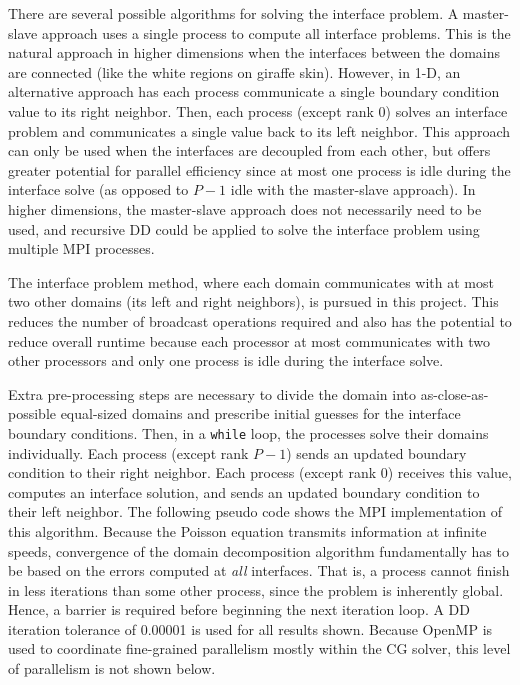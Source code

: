\documentclass[10pt]{article}
\begin{document}
\begin{enumerate}
There are several possible algorithms for solving the interface problem. A master-slave approach uses a single process to compute all interface problems. This is the natural approach in higher dimensions when the interfaces between the domains are connected (like the white regions on giraffe skin). However, in 1-D, an alternative approach has each process communicate a single boundary condition value to its right neighbor. Then, each process (except rank 0) solves an interface problem and communicates a single value back to its left neighbor. This approach can only be used when the interfaces are decoupled from each other, but offers greater potential for parallel efficiency since at most one process is idle during the interface solve (as opposed to \(P-1\) idle with the master-slave approach). In higher dimensions, the master-slave approach does not necessarily need to be used, and recursive DD could be applied to solve the interface problem using multiple MPI processes.
\end{enumerate}

The interface problem method, where each domain communicates with at most two other domains (its left and right neighbors), is pursued in this project. This reduces the number of broadcast operations required and also has the potential to reduce overall runtime because each processor at most communicates with two other processors and only one process is idle during the interface solve. 

Extra pre-processing steps are necessary to divide the domain into as-close-as-possible equal-sized domains and prescribe initial guesses for the interface boundary conditions. Then, in a {\tt while} loop, the processes solve their domains individually. Each process (except rank \(P-1\)) sends an updated boundary condition to their right neighbor. Each process (except rank 0) receives this value, computes an interface solution, and sends an updated boundary condition to their left neighbor. The following pseudo code shows the MPI implementation of this algorithm. Because the Poisson equation transmits information at infinite speeds, convergence of the domain decomposition algorithm fundamentally has to be based on the errors computed at {\it all} interfaces. That is, a process cannot finish in less iterations than some other process, since the problem is inherently global. Hence, a barrier is required before beginning the next iteration loop. A DD iteration tolerance of 0.00001 is used for all results shown. Because OpenMP is used to coordinate fine-grained parallelism mostly within the CG solver, this level of parallelism is not shown below.
\end{document}
